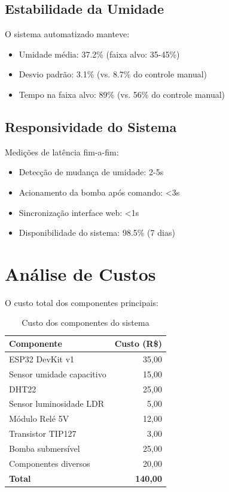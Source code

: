 \documentclass[twoside,english,brazilian]{UNISINOSmonografia}
\begin{document}
\subsection{Estabilidade da Umidade}
O sistema automatizado manteve:
\begin{itemize}
    \item Umidade média: 37.2\% (faixa alvo: 35-45\%)
    \item Desvio padrão: 3.1\% (vs. 8.7\% do controle manual)
    \item Tempo na faixa alvo: 89\% (vs. 56\% do controle manual)
\end{itemize}

\subsection{Responsividade do Sistema}
Medições de latência fim-a-fim:
\begin{itemize}
    \item Detecção de mudança de umidade: 2-5s
    \item Acionamento da bomba após comando: <3s
    \item Sincronização interface web: <1s
    \item Disponibilidade do sistema: 98.5\% (7 dias)
\end{itemize}

\section{Análise de Custos}
O custo total dos componentes principais:

\begin{table}[h]
\centering
\begin{tabular}{|l|r|}
\hline
\textbf{Componente} & \textbf{Custo (R\$)} \\
\hline
ESP32 DevKit v1 & 35,00 \\
Sensor umidade capacitivo & 15,00 \\
DHT22 & 25,00 \\
Sensor luminosidade LDR & 5,00 \\
Módulo Relé 5V & 12,00 \\
Transistor TIP127 & 3,00 \\
Bomba submersível & 25,00 \\
Componentes diversos & 20,00 \\
\hline
\textbf{Total} & \textbf{140,00} \\
\hline
\end{tabular}
\caption{Custo dos componentes do sistema}
\end{table}
\end{document}
